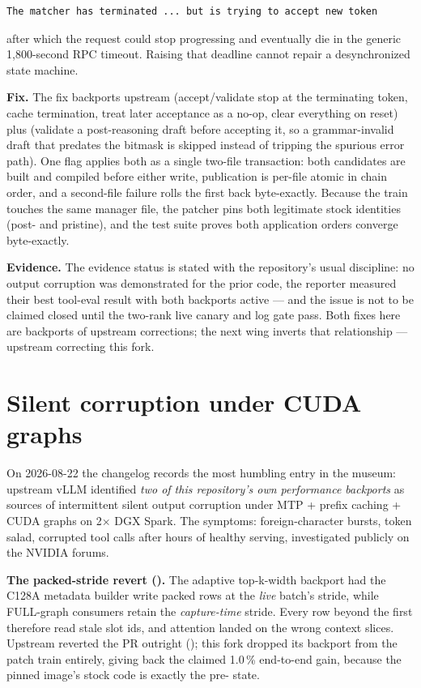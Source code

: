 \begin{lstlisting}
The matcher has terminated ... but is trying to accept new token
\end{lstlisting}

\noindent after which the request could stop progressing and eventually die in the
generic 1{,}800-second  RPC timeout. Raising that deadline
cannot repair a desynchronized state machine.

\textbf{Fix.} The fix backports upstream
 (accept/validate stop at the terminating token, cache
termination, treat later acceptance as a no-op, clear everything on reset)
plus  (validate a post-reasoning draft before accepting it, so
a grammar-invalid draft that predates the bitmask is skipped instead of
tripping the spurious  error path). One flag
applies both as a single two-file transaction: both candidates are built and
compiled before either write, publication is per-file atomic in chain order,
and a second-file failure rolls the first back byte-exactly. Because the
 train touches the same manager file, the patcher pins both
legitimate stock identities (post- and pristine), and the test
suite proves both application orders converge byte-exactly.

\textbf{Evidence.} The evidence status is stated with the repository's usual
discipline: no output corruption was
demonstrated for the prior code, the reporter measured their best tool-eval
result with both backports active --- and the issue is not to be claimed
closed until the two-rank live canary and log gate pass. Both fixes here are
backports of upstream corrections; the next wing inverts that relationship
--- upstream correcting this fork.

\section{Silent corruption under CUDA graphs}
\label{sec:bugs-cudagraph}

On 2026-08-22 the changelog records the most humbling entry in the museum:
upstream vLLM identified \emph{two of this repository's own performance
backports} as sources of intermittent silent output corruption under
MTP + prefix caching + CUDA graphs on 2$\times$ DGX Spark. The symptoms:
foreign-character bursts, token salad, corrupted tool calls after hours of
healthy serving, investigated publicly on the NVIDIA forums.

\textbf{The packed-stride revert ().} The adaptive top-k-width
backport had the C128A metadata builder write packed rows at the \emph{live}
batch's stride, while FULL-graph consumers retain the \emph{capture-time}
stride. Every row beyond the first therefore read stale slot ids, and
attention landed on the wrong context slices. Upstream reverted the PR outright
(); this fork dropped its backport from the patch train
entirely, giving back the claimed 1.0\,\% end-to-end gain, because the pinned
image's stock code is exactly the pre- state.

